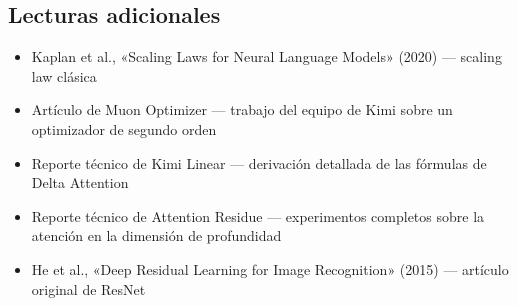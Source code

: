 \subsection{Lecturas adicionales}

\begin{itemize}
    \item Kaplan et al., «Scaling Laws for Neural Language Models» (2020) --- scaling law clásica
    \item Artículo de Muon Optimizer --- trabajo del equipo de Kimi sobre un optimizador de segundo orden
    \item Reporte técnico de Kimi Linear --- derivación detallada de las fórmulas de Delta Attention
    \item Reporte técnico de Attention Residue --- experimentos completos sobre la atención en la dimensión de profundidad
    \item He et al., «Deep Residual Learning for Image Recognition» (2015) --- artículo original de ResNet
\end{itemize}



